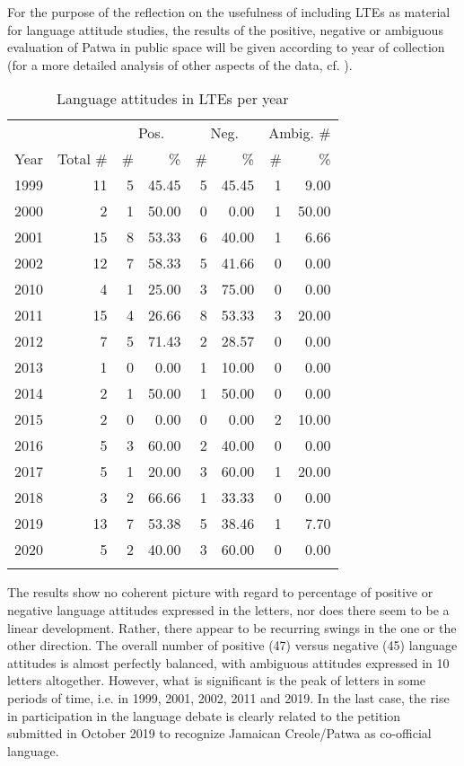 \documentclass[output=paper,colorlinks,citecolor=brown]{langscibook}
\begin{document}
For the purpose of the reflection on the usefulness of including  LTEs as material for language attitude studies, the results of the positive, negative or ambiguous evaluation of Patwa in public space will be given according to year of collection (for a more detailed analysis of other aspects of the data, cf. \citealt{mühleisenmeta}).

\begin{table}
\begin{tabular}{l *7{r}}
\lsptoprule
     &            & \multicolumn{2}{c}{{Pos.}} & \multicolumn{2}{c}{{Neg.}} & \multicolumn{2}{c}{{Ambig. $\#$}}\\\cmidrule(lr){3-4}\cmidrule(lr){5-6}\cmidrule(lr){7-8}
Year & Total $\#$ & \# & \%& \# & \%& \# & \%\\\midrule
1999 & 11 & 5 & 45.45 & 5 & 45.45 & 1 & 9.00 \\
2000 & 2  & 1 & 50.00 & 0 & 0.00  & 1 & 50.00 \\
2001 & 15 & 8 & 53.33 & 6 & 40.00 & 1 & 6.66 \\
2002 & 12 & 7 & 58.33 & 5 & 41.66 & 0 & 0.00 \\
2010 & 4  & 1 & 25.00 & 3 & 75.00 & 0 & 0.00 \\
2011 & 15 & 4 & 26.66 & 8 & 53.33 & 3 & 20.00 \\
2012 & 7  & 5 & 71.43 & 2 & 28.57 & 0 & 0.00 \\
2013 & 1  & 0 & 0.00  & 1 & 10.00 & 0 & 0.00 \\
2014 & 2  & 1 & 50.00 & 1 & 50.00 & 0 & 0.00 \\
2015 & 2  & 0 & 0.00  & 0 & 0.00  & 2 & 10.00 \\
2016 & 5  & 3 & 60.00 & 2 & 40.00 & 0 & 0.00 \\
2017 & 5  & 1 & 20.00 & 3 & 60.00 & 1 & 20.00 \\
2018 & 3  & 2 & 66.66 & 1 & 33.33 & 0 & 0.00 \\
2019 & 13 & 7 & 53.38 & 5 & 38.46 & 1 & 7.70 \\
2020 & 5  & 2 & 40.00 & 3 & 60.00 & 0 & 0.00 \\
\lspbottomrule
\end{tabular}
\caption{Language attitudes in LTEs per year}
\end{table}


\newpage
The results show no coherent picture with regard to percentage of positive or negative language attitudes expressed in the letters, nor does there seem to be a linear development. Rather, there appear to be recurring swings in the one or the other direction. The overall number of positive (47) versus negative (45) language attitudes is almost perfectly balanced, with ambiguous attitudes expressed in 10 letters altogether.  However, what is significant is the peak of letters in some periods of time, i.e. in 1999, 2001, 2002, 2011 and 2019. In the last case, the rise in participation in the language debate is clearly related to the petition submitted in October 2019 to recognize Jamaican Creole/Patwa as co-official language.
\end{document}
